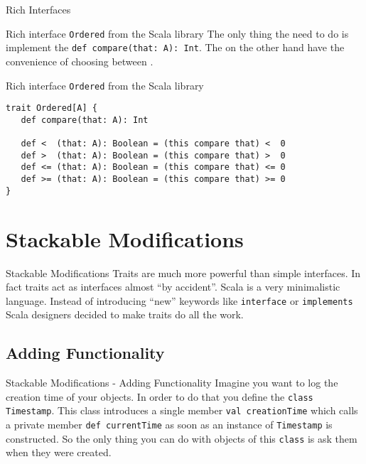 \begin{frame}[fragile]{Rich Interfaces}
\begin{block}{Rich interface \lstinline!Ordered! from the Scala library}
The only thing the  need to do is implement the \lstinline!def compare(that: A): Int!.
The  on the other hand have the convenience of choosing
between .
\end{block}

\begin{block}{Rich interface \lstinline!Ordered! from the Scala library}
\begin{lstlisting}
trait Ordered[A] {
   def compare(that: A): Int
   
   def <  (that: A): Boolean = (this compare that) <  0
   def >  (that: A): Boolean = (this compare that) >  0
   def <= (that: A): Boolean = (this compare that) <= 0
   def >= (that: A): Boolean = (this compare that) >= 0
}
\end{lstlisting}
\end{block}
\end{frame}

\section{Stackable Modifications}
\begin{frame}{Stackable Modifications}
Traits are much more powerful than simple interfaces. In fact traits act as
interfaces almost ``by accident''. Scala is a very minimalistic language. Instead
of introducing ``new'' keywords like \lstinline!interface! or
\lstinline!implements! Scala designers decided to make traits do all the work.
\end{frame}

\subsection{Adding Functionality}
\begin{frame}[fragile]{Stackable Modifications - Adding Functionality}
Imagine you want to log the creation time of your objects. In order to do that you
define the \lstinline!class Timestamp!. This class
introduces a single member \lstinline!val creationTime! which calls a private
member \lstinline!def currentTime! as soon as an instance of
\lstinline!Timestamp! is constructed. So the only thing you can do with objects
of this \lstinline!class! is ask them when they were created.
\end{frame}

